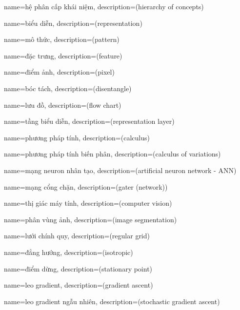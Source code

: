{
    name={hệ phân cấp khái niệm},
    description={(hierarchy of concepts)}
}

{
    name={biểu diễn},
    description={(representation)}
}

{
    name={mô thức},
    description={(pattern)}
}

{
    name={đặc trưng},
    description={(feature)}
}

{
    name={điểm ảnh},
    description={(pixel)}
}

{
    name={bóc tách},
    description={(disentangle)}
}

{
    name={lưu đồ},
    description={(flow chart)}
}

{
    name={tầng biểu diễn},
    description={(representation layer)}
}

{
    name={phương pháp tính},
    description={(calculus)}
}

{
    name={phương pháp tính biến phân},
    description={(calculus of variations)}
}

{
    name={mạng neuron nhân tạo},
    description={(artificial neuron network - ANN)}
}

{
    name={mạng cổng chặn},
    description={(gater (network))}
}

{
    name={thị giác máy tính},
    description={(computer vision)}
}

{
    name={phân vùng ảnh},
    description={(image segmentation)}
}

{
    name={lưới chính quy},
    description={(regular grid)}
}

{
    name={đẳng hướng},
    description={(isotropic)}
}

{
    name={điểm dừng},
    description={(stationary point)}
}

{
    name={leo gradient},
    description={(gradient ascent)}
}

{
    name={leo gradient ngẫu nhiên},
    description={(stochastic gradient ascent)}
}

